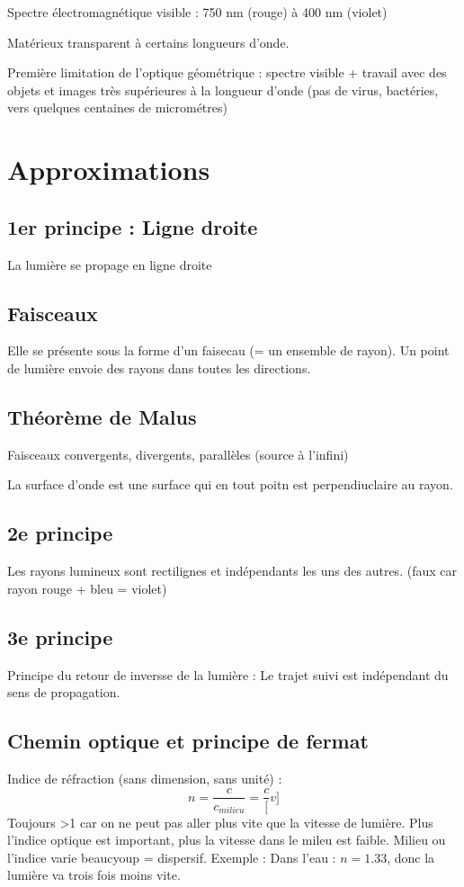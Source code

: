 \documentclass[french]{yLectureNote}
\begin{document}
Spectre électromagnétique visible : 750 nm (rouge) à 400 nm (violet)

Matérieux transparent à certains longueurs d'onde.

Première limitation de l'optique géométrique : spectre visible + travail avec des objets et images très supérieures à la longueur d'onde (pas de virus, bactéries, vers quelques centaines de micrométres)
	\section{Approximations}
	\subsection{1er principe : Ligne droite}
	La lumière se propage en ligne droite
	\subsection{Faisceaux}
	Elle se présente sous la forme d'un faisecau (= un ensemble de rayon). Un point de lumière envoie des rayons dans toutes les directions.
	\subsection{Théorème de Malus}
	Faisceaux convergents, divergents, parallèles (source à l'infini)

	La surface d'onde est une surface qui en tout poitn est perpendiuclaire au rayon.
	\subsection{2e principe}
	Les rayons lumineux sont rectilignes et indépendants les uns des autres.
	(faux car rayon rouge + bleu = violet)
	\subsection{3e principe}
	Principe du retour de inversse de la lumière : Le trajet suivi est indépendant du sens de propagation.
	\subsection{Chemin optique et principe de fermat}
	Indice de réfraction (sans dimension, sans unité) : \[n=\frac{c}{c_{milieu}}= \frac{c}[v]\] Toujours >1 car on ne peut pas aller plus vite que la vitesse de lumière. Plus l'indice optique est important, plus la vitesse dans le mileu est faible.
	Milieu ou l'indice varie beaucyoup = dispersif.
	Exemple : Dans l'eau : $n=1.33$, donc la lumière va trois fois moins vite.
\end{document}
